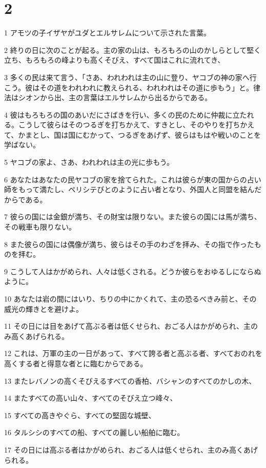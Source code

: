 \chapter{2}

\par 1 アモツの子イザヤがユダとエルサレムについて示された言葉。
\par 2 終りの日に次のことが起る。主の家の山は、もろもろの山のかしらとして堅く立ち、もろもろの峰よりも高くそびえ、すべて国はこれに流れてき、
\par 3 多くの民は来て言う、「さあ、われわれは主の山に登り、ヤコブの神の家へ行こう。彼はその道をわれわれに教えられる、われわれはその道に歩もう」と。律法はシオンから出、主の言葉はエルサレムから出るからである。
\par 4 彼はもろもろの国のあいだにさばきを行い、多くの民のために仲裁に立たれる。こうして彼らはそのつるぎを打ちかえて、すきとし、そのやりを打ちかえて、かまとし、国は国にむかって、つるぎをあげず、彼らはもはや戦いのことを学ばない。
\par 5 ヤコブの家よ、さあ、われわれは主の光に歩もう。
\par 6 あなたはあなたの民ヤコブの家を捨てられた。これは彼らが東の国からの占い師をもって満たし、ペリシテびとのように占い者となり、外国人と同盟を結んだからである。
\par 7 彼らの国には金銀が満ち、その財宝は限りない。また彼らの国には馬が満ち、その戦車も限りない。
\par 8 また彼らの国には偶像が満ち、彼らはその手のわざを拝み、その指で作ったものを拝む。
\par 9 こうして人はかがめられ、人々は低くされる。どうか彼らをおゆるしにならぬように。
\par 10 あなたは岩の間にはいり、ちりの中にかくれて、主の恐るべきみ前と、その威光の輝きとを避けよ。
\par 11 その日には目をあげて高ぶる者は低くせられ、おごる人はかがめられ、主のみ高くあげられる。
\par 12 これは、万軍の主の一日があって、すべて誇る者と高ぶる者、すべておのれを高くする者と得意な者とに臨むからである。
\par 13 またレバノンの高くそびえるすべての香柏、バシャンのすべてのかしの木、
\par 14 またすべての高い山々、すべてのそびえ立つ峰々、
\par 15 すべての高きやぐら、すべての堅固な城壁、
\par 16 タルシシのすべての船、すべての麗しい船舶に臨む。
\par 17 その日には高ぶる者はかがめられ、おごる人は低くせられ、主のみ高くあげられる。
